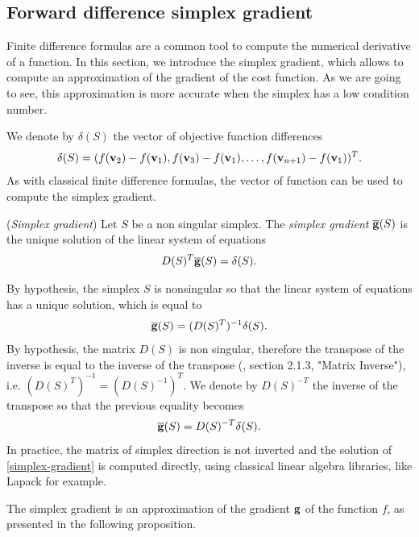 \subsection{Forward difference simplex gradient}
\label{simplex-section-forwardgradient}

Finite difference formulas are a common tool to compute 
the numerical derivative of a function. In this section, we 
introduce the simplex gradient, which allows to compute 
an approximation of the gradient of the cost function.
As we are going to see, this approximation is more accurate
when the simplex has a low condition number.

We denote by $\delta(S)$ the vector of objective function
differences
\begin{eqnarray}
\delta(S) = ( f(\mathbf{v}_2) - f(\mathbf{v}_1), f(\mathbf{v}_3) - f(\mathbf{v}_1), \ldots, f(\mathbf{v}_{n+1}) - f(\mathbf{v}_1))^T.
\end{eqnarray}
As with classical finite difference formulas, the vector of 
function can be used to compute the simplex gradient.
\begin{definition}
(\emph{Simplex gradient})
Let $S$ be a non singular simplex.  The \emph{simplex gradient} $\overline{\mathbf{g}}(S)$ is
the unique solution of the linear system of equations 
\begin{eqnarray}
\label{simplex-gradient}
D(S)^T \overline{\mathbf{g}}(S) = \delta(S).
\end{eqnarray}
\end{definition}

By hypothesis, the simplex $S$ is nonsingular so that the 
linear system of equations has a unique solution, which is 
equal to 
\begin{eqnarray}
\overline{\mathbf{g}}(S) = (D(S)^T)^{-1} \delta(S).
\end{eqnarray}
By hypothesis, the matrix $D(S)$ is non singular, therefore the transpose of the 
inverse is equal to the inverse of the 
transpose (\cite{citeulike:2122238}, section 2.1.3, "Matrix Inverse"), 
i.e. $(D(S)^T)^{-1} = (D(S)^{-1})^T$.
We denote by $D(S)^{-T}$ the inverse of the transpose so that the previous 
equality becomes 
\begin{eqnarray}
\overline{\mathbf{g}}(S) = D(S)^{-T} \delta(S).
\end{eqnarray}
In practice, the matrix of simplex direction is not inverted
and the solution of \ref{simplex-gradient} is computed directly, 
using classical linear algebra libraries, like Lapack for example.

The simplex gradient is an approximation of the 
gradient $\mathbf{g}$ of the function $f$, as presented in the following 
proposition.

